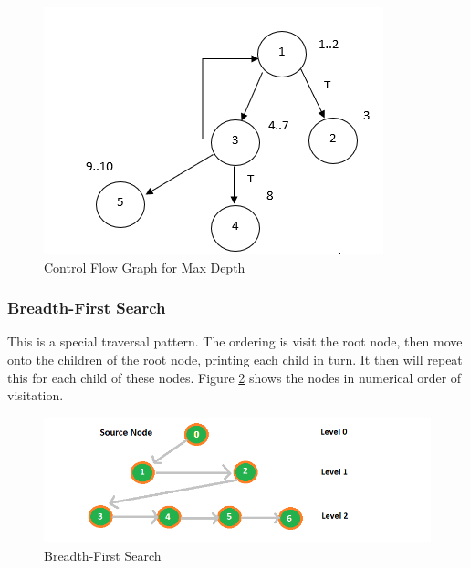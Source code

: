 \documentclass[10pt,twocolumn,hidelinks]{IEEEtran}
\begin{document}
\begin{figure}[h]
\includegraphics[scale=0.4]{CFGMaxDepthAlgo12.png}
\caption{Control Flow Graph for Max Depth}
\label{fig:cfgmaxdepth}
\end{figure}
\subsubsection{Breadth-First Search}
This is a special traversal pattern. The ordering is visit the root node, then move onto the children of the root node, printing each child in turn. It then will repeat this for each child of these nodes. Figure \ref{fig:breadth} shows the nodes in numerical order of visitation.
\begin{figure}[h]
\includegraphics[scale=0.5]{bfs.png}
\caption{Breadth-First Search}
\label{fig:breadth}
\end{figure}
 \\
\end{document}
